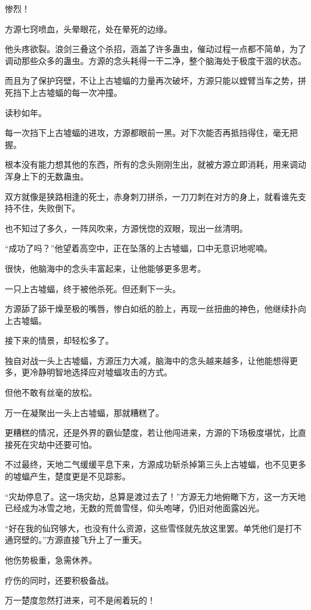 \begin{this_body}
惨烈！

方源七窍喷血，头晕眼花，处在晕死的边缘。

他头疼欲裂。浪剑三叠这个杀招，涵盖了许多蛊虫，催动过程一点都不简单，为了调动那些众多的蛊虫。方源的念头耗得一干二净，整个脑海处于极度干涸的状态。

而且为了保护窍壁，不让上古墟蝠的力量再次破坏，方源只能以螳臂当车之势，拼死挡下上古墟蝠的每一次冲撞。

读秒如年。

每一次挡下上古墟蝠的进攻，方源都眼前一黑。对下次能否再抵挡得住，毫无把握。

根本没有能力想其他的东西，所有的念头刚刚生出，就被方源立即消耗，用来调动浑身上下的无数蛊虫。

双方就像是狭路相逢的死士，赤身刺刀拼杀，一刀刀刺在对方的身上，就看谁先支持不住，失败倒下。

也不知过了多久，一阵风吹来，方源恍惚的双眼，现出一丝清明。

“成功了吗？”他望着高空中，正在坠落的上古墟蝠，口中无意识地呢喃。

很快，他脑海中的念头丰富起来，让他能够更多思考。

一只上古墟蝠，终于被他杀死。但还剩下一头。

方源舔了舔干燥至极的嘴唇，惨白如纸的脸上，再现一丝扭曲的神色，他继续扑向上古墟蝠。

接下来的情景，却轻松多了。

独自对战一头上古墟蝠，方源压力大减，脑海中的念头越来越多，让他能想得更多，更冷静明智地选择应对墟蝠攻击的方式。

但他不敢有丝毫的放松。

万一在凝聚出一头上古墟蝠，那就糟糕了。

更糟糕的情况，还是外界的霸仙楚度，若让他闯进来，方源的下场极度堪忧，比直接死在灾劫中还要可怕。

不过最终，天地二气缓缓平息下来，方源成功斩杀掉第三头上古墟蝠，也不见更多的墟蝠产生，楚度更是不见踪影。

“灾劫停息了。这一场灾劫，总算是渡过去了！”方源无力地俯瞰下方，这一方天地已经成为冰雪之地，无数的荒兽雪怪，仰头咆哮，仍旧对他面露凶光。

“好在我的仙窍够大，也没有什么资源，这些雪怪就先放这里罢。单凭他们是打不通窍壁的。”方源直接飞升上了一重天。

他伤势极重，急需休养。

疗伤的同时，还要积极备战。

万一楚度忽然打进来，可不是闹着玩的！

\end{this_body}

